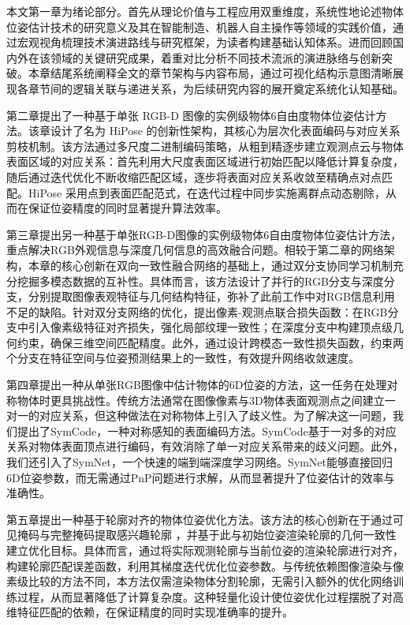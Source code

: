 \par 本文第一章为绪论部分。首先从理论价值与工程应用双重维度，系统性地论述物体位姿估计技术的研究意义及其在智能制造、机器人自主操作等领域的实践价值，通过宏观视角梳理技术演进路线与研究框架，为读者构建基础认知体系。进而回顾国内外在该领域的关键研究成果，着重对比分析不同技术流派的演进脉络与创新突破。本章结尾系统阐释全文的章节架构与内容布局，通过可视化结构示意图清晰展现各章节间的逻辑关联与递进关系，为后续研究内容的展开奠定系统化认知基础。

\par 第二章提出了一种基于单张 RGB-D 图像的实例级物体6自由度物体位姿估计方法。该章设计了名为 HiPose 的创新性架构，其核心为层次化表面编码与对应关系剪枝机制。该方法通过多尺度二进制编码策略，从粗到精逐步建立观测点云与物体表面区域的对应关系：首先利用大尺度表面区域进行初始匹配以降低计算复杂度，随后通过迭代优化不断收缩匹配区域，逐步将表面对应关系收敛至精确点对点匹配。HiPose 采用点到表面匹配范式，在迭代过程中同步实施离群点动态剔除，从而在保证位姿精度的同时显著提升算法效率。

\par 第三章提出另一种基于单张RGB-D图像的实例级物体6自由度物体位姿估计方法，重点解决RGB外观信息与深度几何信息的高效融合问题。相较于第二章的网络架构，本章的核心创新在双向一致性融合网络的基础上，通过双分支协同学习机制充分挖掘多模态数据的互补性。具体而言，该方法设计了并行的RGB分支与深度分支，分别提取图像表观特征与几何结构特征，弥补了此前工作中对RGB信息利用不足的缺陷。针对双分支网络的优化，提出像素-观测点联合损失函数：在RGB分支中引入像素级特征对齐损失，强化局部纹理一致性；在深度分支中构建顶点级几何约束，确保三维空间匹配精度。此外，通过设计跨模态一致性损失函数，约束两个分支在特征空间与位姿预测结果上的一致性，有效提升网络收敛速度。

\par 第四章提出一种从单张RGB图像中估计物体的6D位姿的方法，这一任务在处理对称物体时更具挑战性。传统方法通常在图像像素与3D物体表面观测点之间建立一对一的对应关系，但这种做法在对称物体上引入了歧义性。为了解决这一问题，我们提出了SymCode，一种对称感知的表面编码方法。SymCode基于一对多的对应关系对物体表面顶点进行编码，有效消除了单一对应关系带来的歧义问题。此外，我们还引入了SymNet，一个快速的端到端深度学习网络。SymNet能够直接回归6D位姿参数，而无需通过PnP问题进行求解，从而显著提升了位姿估计的效率与准确性。

\par 第五章提出一种基于轮廓对齐的物体位姿优化方法。该方法的核心创新在于通过可见掩码与完整掩码提取感兴趣轮廓 ，并基于此与初始位姿渲染轮廓的几何一致性建立优化目标。具体而言，通过将实际观测轮廓与当前位姿的渲染轮廓进行对齐，构建轮廓匹配误差函数，利用其梯度迭代优化位姿参数。与传统依赖图像渲染与像素级比较的方法不同，本方法仅需渲染物体分割轮廓，无需引入额外的优化网络训练过程，从而显著降低了计算复杂度。这种轻量化设计使位姿优化过程摆脱了对高维特征匹配的依赖，在保证精度的同时实现准确率的提升。

